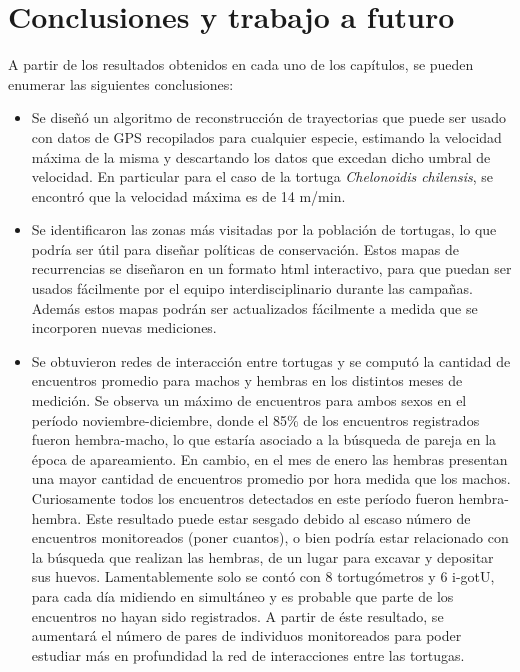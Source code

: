 \chapter{Conclusiones y trabajo a futuro}
A partir de los resultados obtenidos en cada uno de los capítulos, 
se pueden enumerar las siguientes conclusiones:

\begin{itemize}

\item Se diseñó un algoritmo de reconstrucción de trayectorias que puede ser usado con datos de GPS recopilados para cualquier especie, estimando la velocidad máxima de la misma y descartando los datos que excedan dicho umbral de velocidad. En particular para el caso de la tortuga \textit{Chelonoidis chilensis}, se encontró que la velocidad máxima es de 14 m/min.

\item Se identificaron las zonas más visitadas por la población de tortugas, lo que podría ser útil para diseñar políticas de conservación. Estos mapas de recurrencias se diseñaron en un formato html interactivo, para que puedan ser usados fácilmente por el equipo interdisciplinario durante las campañas. Además estos mapas podrán ser actualizados fácilmente a medida que se incorporen nuevas mediciones.
 
\item Se obtuvieron redes de interacción entre tortugas y se computó 
la cantidad de encuentros promedio para machos y hembras 
en los distintos meses de medición. Se observa un máximo de encuentros 
para 
ambos sexos en el período noviembre-diciembre, donde el 85\% de los 
encuentros registrados 
fueron hembra-macho, lo que estaría asociado a la búsqueda 
de pareja en la época de apareamiento. En cambio, en el mes de enero las 
hembras presentan una mayor cantidad de encuentros promedio 
por hora medida que los machos. Curiosamente todos los encuentros detectados
en este período fueron hembra-hembra. Este resultado puede estar sesgado debido
al escaso número de encuentros monitoreados (poner cuantos), o bien podría 
estar relacionado con 
la búsqueda que realizan las hembras, de un lugar para excavar y depositar sus 
huevos. 
Lamentablemente solo se contó con 8 tortugómetros y 6 i-gotU, para cada 
día midiendo en simultáneo y es probable que parte de los 
encuentros no hayan sido registrados. A partir de éste resultado, 
se aumentará el número de pares de individuos 
monitoreados para poder estudiar más en profundidad la red de interacciones 
entre las tortugas.
 

\end{itemize}
